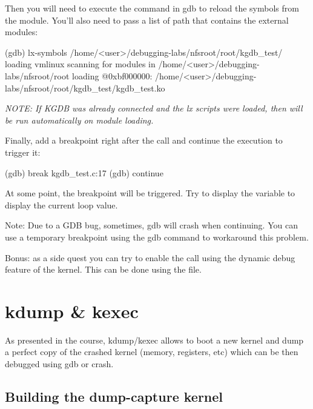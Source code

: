 
Then you will need to execute the  command in gdb to reload the
symbols from the module. You'll also need to pass a list of path that contains
the external modules:

\begin{bashinput}
(gdb) lx-symbols /home/<user>/debugging-labs/nfsroot/root/kgdb_test/
loading vmlinux
scanning for modules in /home/<user>/debugging-labs/nfsroot/root
loading @0xbf000000: /home/<user>/debugging-labs/nfsroot/root/kgdb_test/kgdb_test.ko
\end{bashinput}

{\em NOTE: If KGDB was already connected and the lx scripts were loaded, then
 will be run automatically on module loading.}

Finally, add a breakpoint right after the  call and continue
the execution to trigger it:

\begin{bashinput}
(gdb) break kgdb_test.c:17
(gdb) continue
\end{bashinput}

At some point, the breakpoint will be triggered. Try to display the variable
 to display the current loop value.

Note: Due to a GDB bug, sometimes, gdb will crash when continuing. You can
use a temporary breakpoint using the gdb  command to workaround
this problem.

Bonus: as a side quest you can try to enable the  call using
the dynamic debug feature of the kernel. This can be done using the
 file.

\section{kdump \& kexec}

As presented in the course, kdump/kexec allows to boot a new kernel and dump a
perfect copy of the crashed kernel (memory, registers, etc) which can be then
debugged using gdb or crash. 

\subsection{Building the dump-capture kernel}

